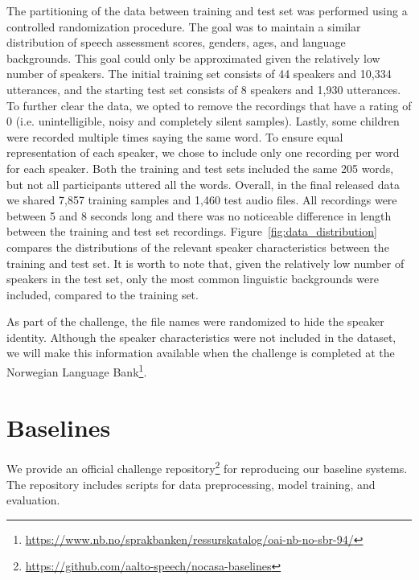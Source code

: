 \documentclass{article}
\begin{document}
The partitioning of the data between training and test set was performed using a controlled randomization procedure.
The goal was to maintain a similar distribution of speech assessment scores, genders, ages, and language backgrounds.
This goal could only be approximated given the relatively low number of speakers.
The initial training set consists of 44 speakers and 10,334 utterances, and the starting test set consists of 8 speakers and 1,930 utterances. To further clear the data, we opted to remove the recordings that have a rating of 0 (i.e. unintelligible, noisy and completely silent samples). Lastly, some children were recorded multiple times saying the same word. To ensure equal representation of each speaker, we chose to include only one recording per word for each speaker. 
Both the training and test sets included the same 205 words, but not all participants uttered all the words.
Overall, in the final released data we shared 7,857 training samples and 1,460 test audio files.
All recordings were between 5 and 8 seconds long and there was no noticeable difference in length between the training and test set recordings.
Figure~\ref{fig:data_distribution} compares the distributions of the relevant speaker characteristics between the training and test set.
It is worth to note that, given the relatively low number of speakers in the test set, only the most common linguistic backgrounds were included, compared to the training set.

As part of the challenge, the file names were randomized to hide the speaker identity.
Although the speaker characteristics were not included in the dataset, we will make this information available when the challenge is completed at the Norwegian Language Bank\footnote{\url{https://www.nb.no/sprakbanken/ressurskatalog/oai-nb-no-sbr-94/}}.


\section{Baselines}
\label{sec:baselines}

We provide an official challenge repository\footnote{\url{https://github.com/aalto-speech/nocasa-baselines}} for reproducing our baseline systems. The repository includes scripts for data preprocessing, model training, and evaluation.
\end{document}
